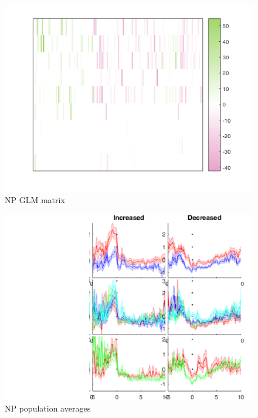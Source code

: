 \documentclass[11pt]{article}
\begin{document}
\begin{figure}[h]
\centering
\includegraphics[width=\textwidth]{Fig 9 - NP GLM matrix.png}
\caption{NP GLM matrix}
\label{fig:NP_GLM}
\end{figure}

\begin{figure}[h]
\centering
\includegraphics[width=\textwidth]{Fig 10 - NP population averages.png}
\caption{NP population averages}
\label{fig:NP_pop}
\end{figure}
\end{document}
